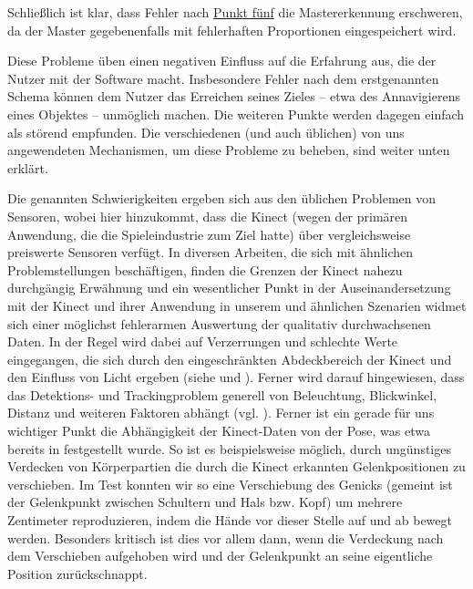 	Schließlich ist klar, dass Fehler nach \hyperref[itm:problem5]{Punkt fünf} die Mastererkennung erschweren, da der Master gegebenenfalls mit fehlerhaften Proportionen eingespeichert wird.
\par\bigskip
	Diese Probleme üben einen negativen Einfluss auf die Erfahrung aus, die der Nutzer mit der Software macht. Insbesondere Fehler nach dem erstgenannten Schema können dem Nutzer das Erreichen seines Zieles -- etwa des Annavigierens eines Objektes -- unmöglich machen. Die weiteren Punkte werden dagegen einfach als störend empfunden. Die verschiedenen (und auch üblichen) von uns angewendeten Mechanismen, um diese Probleme zu beheben, sind weiter unten erklärt.\par
	Die genannten Schwierigkeiten ergeben sich aus den üblichen Problemen von Sensoren, wobei hier hinzukommt, dass die Kinect (wegen der primären Anwendung, die die Spieleindustrie zum Ziel hatte) über vergleichsweise preiswerte Sensoren verfügt. In diversen Arbeiten, die sich mit ähnlichen Problemstellungen beschäftigen, finden die Grenzen der Kinect nahezu durchgängig Erwähnung und ein wesentlicher Punkt in der Auseinandersetzung mit der Kinect und ihrer Anwendung in unserem und ähnlichen Szenarien widmet sich einer möglichst fehlerarmen Auswertung der qualitativ durchwachsenen Daten. In der Regel wird dabei auf Verzerrungen und schlechte Werte eingegangen, die sich durch den eingeschränkten \glqq Abdeckbereich\grqq{} der Kinect und den Einfluss von Licht ergeben (siehe \cite{bodyprop} und \cite{kinectlight}). Ferner wird darauf hingewiesen, dass das Detektions- und Trackingproblem generell von Beleuchtung, Blickwinkel, Distanz und weiteren Faktoren abhängt (vgl. \cite{thermalsens}). Ferner ist ein gerade für uns wichtiger Punkt die Abhängigkeit der Kinect-Daten von der Pose, was etwa bereits in \cite{biomid} festgestellt wurde. So ist es beispielsweise möglich, durch ungünstiges Verdecken von Körperpartien die durch die Kinect erkannten Gelenkpositionen zu verschieben. Im Test konnten wir so eine Verschiebung des Genicks (gemeint ist der Gelenkpunkt zwischen Schultern und Hals bzw. Kopf) um mehrere Zentimeter reproduzieren, indem die Hände vor dieser Stelle auf und ab bewegt werden. Besonders kritisch ist dies vor allem dann, wenn die Verdeckung nach dem Verschieben aufgehoben wird und der Gelenkpunkt an seine eigentliche Position \glqq zurückschnappt\grqq{}.
